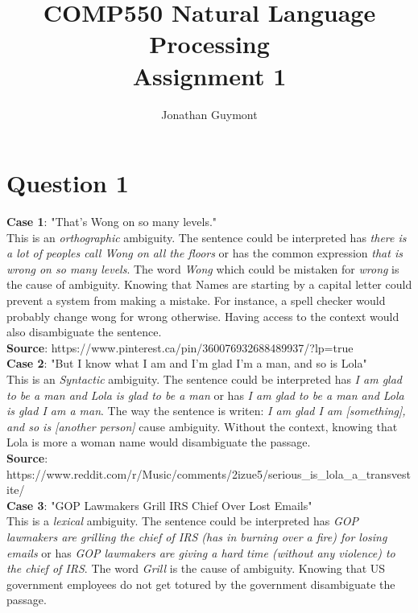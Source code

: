 \documentclass[12pt]{article}
\begin{document}
\title{COMP550 Natural Language Processing\\Assignment 1}
\author{Jonathan Guymont}
\maketitle

\section*{Question 1}
\textbf{Case 1}: "That's Wong on so many levels."\\

This is an \textit{orthographic} ambiguity. The sentence could be interpreted has \textit{there is a lot of peoples call Wong on all the floors} or has the common expression \textit{that is wrong on so many levels}. The word \textit{Wong} which could be mistaken for \textit{wrong} is the cause of ambiguity. Knowing that Names are starting by a capital letter could prevent a system from making a mistake. For instance, a spell checker would probably change wong for wrong otherwise. Having access to the context would also disambiguate the sentence. \\

\textbf{Source}: https://www.pinterest.ca/pin/360076932688489937/?lp=true\\

\textbf{Case 2}: "But I know what I am and I'm glad I'm a man, and so is Lola"\\

This is an \textit{Syntactic} ambiguity. The sentence could be interpreted has \textit{I am glad to be a man and Lola is glad to be a man} or has \textit{I am glad to be a man and Lola is glad I am a man}. The way the sentence is writen: \textit{I am glad I am [something], and so is [another person]} cause ambiguity. Without the context, knowing that Lola is more a woman name would disambiguate the passage.\\

\textbf{Source}: https://www.reddit.com/r/Music/comments/2izue5/serious\_is\_lola\_a\_transvestite/\\

\textbf{Case 3}: "GOP Lawmakers Grill IRS Chief Over Lost Emails"\\

This is a \textit{lexical} ambiguity. The sentence could be interpreted has \textit{GOP lawmakers are grilling the chief of IRS (has in burning over a fire) for losing emails} or has \textit{GOP lawmakers are giving a hard time (without any violence) to the chief of IRS}. The word \textit{Grill} is the cause of ambiguity. Knowing that US government employees do not get totured by the government disambiguate the passage.\\
\end{document}
